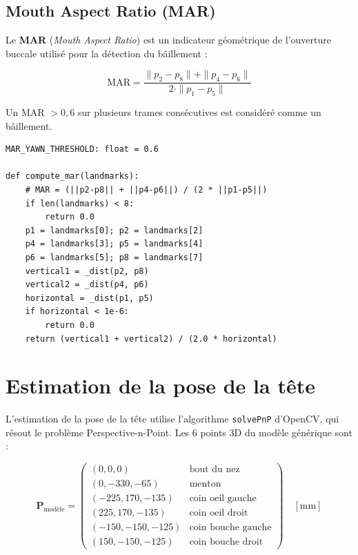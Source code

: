 \documentclass[12pt,a4paper]{report}
\begin{document}
\subsection{Mouth Aspect Ratio (MAR)}

Le \textbf{MAR} (\textit{Mouth Aspect Ratio}) est un indicateur g\'eom\'etrique de l'ouverture buccale utilis\'e pour la d\'etection du b\^aillement :

\begin{equation}
  \text{MAR} = \frac{\|p_2 - p_8\| + \|p_4 - p_6\|}{2 \cdot \|p_1 - p_5\|}
  \label{eq:mar}
\end{equation}

Un MAR $> 0{,}6$ sur plusieurs trames cons\'ecutives est consid\'er\'e comme un b\^aillement.

\begin{lstlisting}[style=python, caption={Calcul du MAR (behavioral\_analysis.py)}, label=lst:mar]
MAR_YAWN_THRESHOLD: float = 0.6

def compute_mar(landmarks):
    # MAR = (||p2-p8|| + ||p4-p6||) / (2 * ||p1-p5||)
    if len(landmarks) < 8:
        return 0.0
    p1 = landmarks[0]; p2 = landmarks[2]
    p4 = landmarks[3]; p5 = landmarks[4]
    p6 = landmarks[5]; p8 = landmarks[7]
    vertical1 = _dist(p2, p8)
    vertical2 = _dist(p4, p6)
    horizontal = _dist(p1, p5)
    if horizontal < 1e-6:
        return 0.0
    return (vertical1 + vertical2) / (2.0 * horizontal)
\end{lstlisting}

\section{Estimation de la pose de la t\^ete}

L'estimation de la pose de la t\^ete utilise l'algorithme \texttt{solvePnP} d'OpenCV, qui r\'esout le probl\`eme Perspective-n-Point. Les 6 points 3D du mod\`ele g\'en\'erique sont :

\begin{equation}
  \mathbf{P}_{\text{mod\`ele}} = \begin{pmatrix}
    (0,0,0) & \text{bout du nez} \\
    (0,-330,-65) & \text{menton} \\
    (-225,170,-135) & \text{coin oeil gauche} \\
    (225,170,-135) & \text{coin oeil droit} \\
    (-150,-150,-125) & \text{coin bouche gauche} \\
    (150,-150,-125) & \text{coin bouche droit}
  \end{pmatrix}
  \quad [\text{mm}]
\end{equation}
\end{document}
